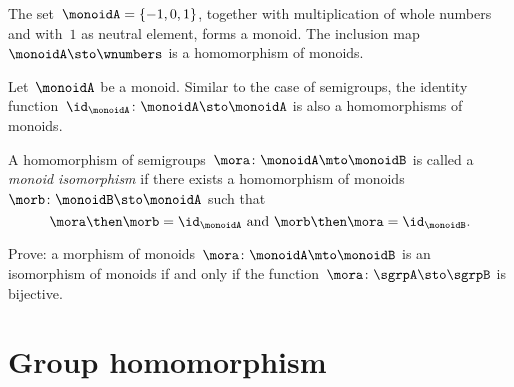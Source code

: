 \begin{example}
  The set~$\monoidA = \{ -1, 0, 1 \}$, together with multiplication of whole numbers and with~$1$ as neutral element, forms a monoid. The inclusion map~$\monoidA \sto \wnumbers$ is a homomorphism of monoids.
\end{example}



\begin{definition}
  \label{def:identity-mon-mor}
  Let~$\monoidA$ be a monoid. Similar to the case of semigroups, the identity function~$\id_\monoidA\colon \monoidA \sto \monoidA$ is also a homomorphisms of monoids.
\end{definition}



\begin{definition}
  \label{def:monoid-iso}
  A homomorphism of semigroups~$\mora\colon \monoidA \mto \monoidB$ is called a \emph{monoid isomorphism} if there exists a homomorphism of monoids~$\morb\colon \monoidB \sto \monoidA$ such that
  \begin{equation}
    \mora \then \morb = \id_\monoidA \text{ and } \morb \then \mora = \id_\monoidB.
  \end{equation}
\end{definition}


\begin{exercise}
  Prove: a morphism of monoids~$\mora\colon \monoidA \mto \monoidB$ is an isomorphism of monoids if and only if the function~$\mora\colon \sgrpA \sto \sgrpB$ is bijective.
\end{exercise}
\begin{solution}
\end{solution}


\section{Group homomorphism}




